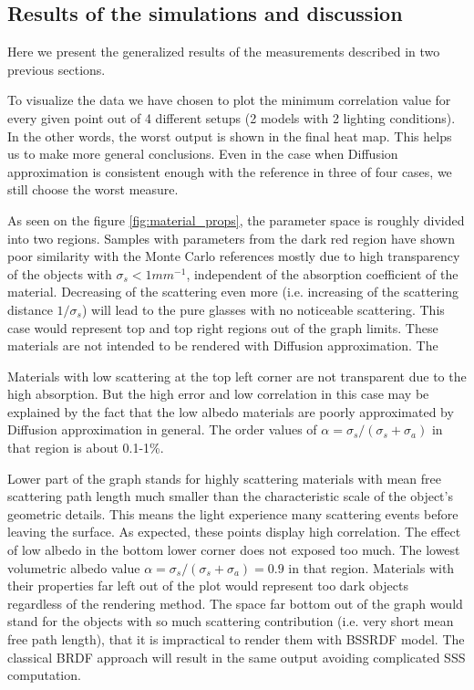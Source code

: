 \subsection{Results of the simulations and discussion}
\label{section:measurements_results}
Here we present the generalized results of the measurements described in two previous sections.

To visualize the data we have chosen to plot the minimum correlation value for every given point out
of 4 different setups (2 models with 2 lighting conditions). In the other words, the worst output is
shown in the final heat map. This helps us to make more general conclusions. Even in the case when
Diffusion approximation is consistent enough with the reference in three of four cases, we still
choose the worst measure.

As seen on the figure \ref{fig:material_props}, the parameter space is roughly divided into two
regions. Samples with parameters from the dark red region have shown poor similarity with the Monte
Carlo references mostly due to high transparency of the objects with $\sigma_s<1 mm^{-1}$,
independent of the absorption coefficient of the material. Decreasing of the scattering even more
(i.e. increasing of the scattering distance $1/\sigma_s$) will lead to the pure glasses with no
noticeable scattering. This case would represent top and top right regions out of the graph limits.
These materials are not intended to be rendered with Diffusion approximation. The 

Materials with low scattering at the top left corner are not transparent due to the high absorption.
But the high error and low correlation in this case may be explained by the fact that the low albedo
materials are poorly approximated by Diffusion approximation in general. The order values of
$\alpha=\sigma_s/(\sigma_s+\sigma_a)$ in that region is about 0.1-1\%.

Lower part of the graph stands for highly scattering materials with mean free scattering path length
much smaller than the characteristic scale of the object's geometric details. This means the light
experience many scattering events before leaving the surface. As expected, these points display high
correlation. The effect of low albedo in the bottom lower corner does not exposed too much. The
lowest volumetric albedo value $\alpha=\sigma_s/(\sigma_s+\sigma_a)=0.9$  in that region. Materials
with their properties far left out of the plot would represent too dark objects regardless of the
rendering method.
The space far bottom out of the graph would stand for the objects with so much scattering
contribution (i.e. very short mean free path length), that it is impractical to render them with
BSSRDF model.
The classical BRDF approach will result in the same output avoiding complicated SSS computation.

